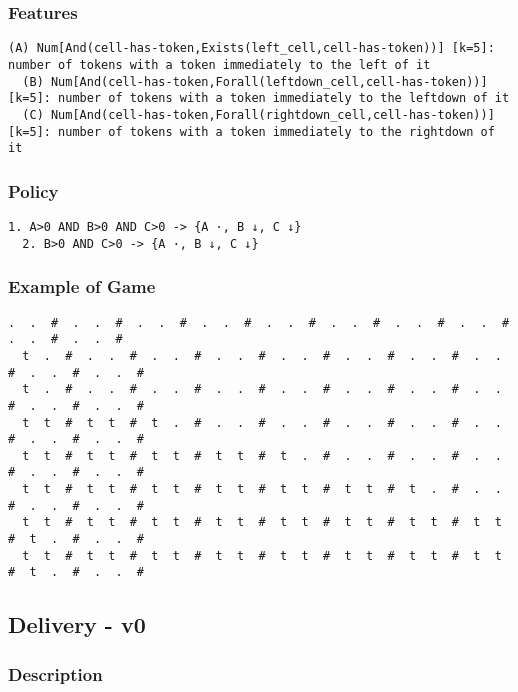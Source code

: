 \documentclass[a4paper]{article}
\begin{document}
\subsubsection{Features}
\begin{Verbatim}[fontsize=\footnotesize]
  (A) Num[And(cell-has-token,Exists(left_cell,cell-has-token))] [k=5]: number of tokens with a token immediately to the left of it
  (B) Num[And(cell-has-token,Forall(leftdown_cell,cell-has-token))] [k=5]: number of tokens with a token immediately to the leftdown of it
  (C) Num[And(cell-has-token,Forall(rightdown_cell,cell-has-token))] [k=5]: number of tokens with a token immediately to the rightdown of it

\end{Verbatim}

\subsubsection{Policy}
\begin{Verbatim}[fontsize=\footnotesize]
  1. A>0 AND B>0 AND C>0 -> {A ·, B ↓, C ↓}
  2. B>0 AND C>0 -> {A ·, B ↓, C ↓}

\end{Verbatim}

\subsubsection{Example of Game}
\begin{Verbatim}[fontsize=\footnotesize]
  .  .  #  .  .  #  .  .  #  .  .  #  .  .  #  .  .  #  .  .  #  .  .  #  .  .  #  .  .  #
  t  .  #  .  .  #  .  .  #  .  .  #  .  .  #  .  .  #  .  .  #  .  .  #  .  .  #  .  .  #
  t  .  #  .  .  #  .  .  #  .  .  #  .  .  #  .  .  #  .  .  #  .  .  #  .  .  #  .  .  #
  t  t  #  t  t  #  t  .  #  .  .  #  .  .  #  .  .  #  .  .  #  .  .  #  .  .  #  .  .  #
  t  t  #  t  t  #  t  t  #  t  t  #  t  .  #  .  .  #  .  .  #  .  .  #  .  .  #  .  .  #
  t  t  #  t  t  #  t  t  #  t  t  #  t  t  #  t  t  #  t  .  #  .  .  #  .  .  #  .  .  #
  t  t  #  t  t  #  t  t  #  t  t  #  t  t  #  t  t  #  t  t  #  t  t  #  t  .  #  .  .  #
  t  t  #  t  t  #  t  t  #  t  t  #  t  t  #  t  t  #  t  t  #  t  t  #  t  .  #  .  .  #
\end{Verbatim}


\subsection{Delivery - v0}
\subsubsection{Description}
\end{document}
